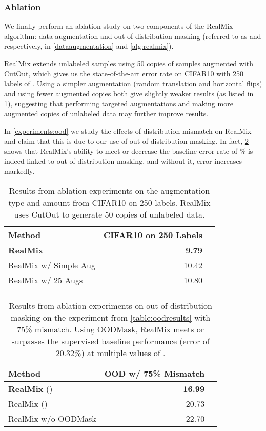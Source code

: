 \documentclass[10pt,twocolumn,letterpaper]{article}
\begin{document}
\subsubsection{Ablation}

We finally perform an ablation study on two components of the RealMix algorithm: data augmentation and out-of-distribution masking (referred to as  and  respectively, in \cref{dataaugmentation} and \cref{alg:realmix}). 

RealMix extends unlabeled samples using 50 copies of samples augmented with CutOut\cite{cutoutDevries}, which gives us the state-of-the-art error rate on CIFAR10 with 250 labels of . Using a simpler augmentation (random translation and horizontal flips) and using fewer augmented copies both give slightly weaker results (as listed in \cref{table:ablationdataaug}), suggesting that performing targeted augmentations and making more augmented copies of unlabeled data may further improve results. 

In \cref{experiments:ood} we study the effects of distribution mismatch on RealMix and claim that this is due to our use of out-of-distribution masking. In fact, \cref{table:ablationood} shows that RealMix's ability to meet or decrease the baseline error rate of \% is indeed linked to out-of-distribution masking, and without it, error increases markedly.
\begin{center}
    \begin{table}[h]
\centering
\begin{tabular}{lrr}
    \hline
      Method & CIFAR10 on 250 Labels \\ \hline
      \textbf{RealMix} &\textbf{ 9.79} \\
      RealMix w/ Simple Aug & 10.42 \\
      RealMix w/ 25 Augs & 10.80 \\\hline\\
\end{tabular}
\caption{Results from ablation experiments on the augmentation type and amount from CIFAR10 on 250 labels. RealMix uses CutOut\cite{cutoutDevries} to generate 50 copies of unlabeled data.}
\label{table:ablationdataaug}
\vskip -0.4in
\end{table}
\end{center}

\begin{center}
    \begin{table}[h]
\centering
\begin{tabular}{lrr}
    \hline
      Method & OOD w/ 75\% Mismatch \\ \hline
      \textbf{RealMix }() & \textbf{16.99} \\
      RealMix () & 20.73\\
      RealMix w/o OODMask & 22.70 \\\hline
\end{tabular}
\caption{Results from ablation experiments on out-of-distribution masking on the experiment from \cref{table:oodresults} with 75\% mismatch. Using OODMask, RealMix meets or surpasses the supervised baseline performance (error of 20.32\%) at multiple values of .}
\label{table:ablationood}
\end{table}
\end{center}
\end{document}
